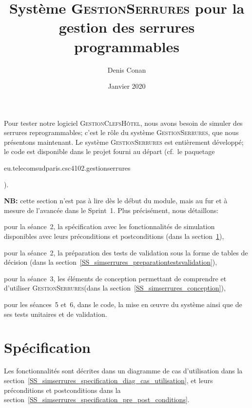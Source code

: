 \documentclass[11pt,article]{article}
\newcommand{\gestionclefshotel}{\textsc{GestionClefsHôtel}\xspace}
\newcommand{\gestionserrures}{\textsc{GestionSerrures}\xspace}
\begin{document}
\title{Système \gestionserrures pour la gestion des serrures programmables}
\author{Denis Conan}
\date{Janvier 2020}
\maketitle

\newpage

\tableofcontents

\newpage

Pour tester notre logiciel \gestionclefshotel, nous avons besoin de
simuler des serrures reprogrammables; c'est le rôle du système
\gestionserrures, que nous présentons maintenant. Le système
\gestionserrures est entièrement développé; le code est disponible
dans le projet fourni au départ (cf.~le
paquetage \begin{small}\textsf{eu.telecomsudparis.csc4102.gestionserrures}\end{small}).

\textbf{NB:} cette section n'est pas à lire dès le début du module,
mais au fur et à mesure de l'avancée dans le Sprint~1. Plus
précisément, nous détaillons:
\begin{compactitem}
\item pour la séance~2, la spécification avec les fonctionnalités de
simulation disponibles avec leurs préconditions et postconditions
(dans la section~\ref{SS_simserrures_specification}),
\item pour la séance~2, la préparation des tests de validation sous la
  forme de tables de décision (dans la
  section~\ref{SS_simserrures_preparationtestsvalidation}),
\item pour la séance~3, les éléments de conception permettant de
  comprendre et d'utiliser \gestionserrures (dans la
  section~\ref{SS_simserrures_conception}),
\item pour les séances~5 et~6, dans le code, la mise en œuvre du
système ainsi que de ses tests unitaires et de validation.
\end{compactitem}

\section{Spécification}
\label{SS_simserrures_specification}

Les fonctionnalités sont décrites dans un diagramme de cas
d'utilisation dans la
section~\ref{SS_simserrures_specification_diag_cas_utilisation}, et
leurs préconditions et postconditions dans la
section~\ref{SS_simserrures_specification_pre_post_conditions}.
\end{document}
